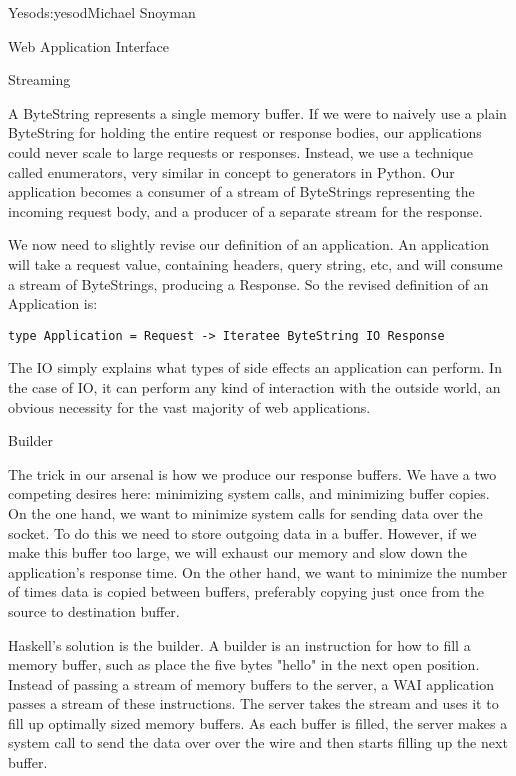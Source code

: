 \begin{aosachapter}{Yesod}{s:yesod}{Michael Snoyman}
\begin{aosasect1}{Web Application Interface}
\begin{aosasect2}{Streaming}

A ByteString represents a single memory buffer. If we were to naively
use a plain ByteString for holding the entire request or response
bodies, our applications could never scale to large requests or
responses. Instead, we use a technique called enumerators, very
similar in concept to generators in Python. Our application becomes a
consumer of a stream of ByteStrings representing the incoming request
body, and a producer of a separate stream for the response.

We now need to slightly revise our definition of an application. An
application will take a request value, containing headers, query
string, etc, and will consume a stream of ByteStrings, producing a
Response. So the revised definition of an Application is:

\begin{verbatim}
type Application = Request -> Iteratee ByteString IO Response
\end{verbatim}

The IO simply explains what types of side effects an application can
perform. In the case of IO, it can perform any kind of interaction
with the outside world, an obvious necessity for the vast majority of
web applications.

\end{aosasect2}

\begin{aosasect2}{Builder}

The trick in our arsenal is how we produce our response buffers. We
have a two competing desires here: minimizing system calls, and
minimizing buffer copies. On the one hand, we want to minimize system
calls for sending data over the socket. To do this we need to store
outgoing data in a buffer. However, if we make this buffer too large,
we will exhaust our memory and slow down the application's response
time. On the other hand, we want to minimize the number of times data
is copied between buffers, preferably copying just once from the
source to destination buffer.

Haskell's solution is the builder. A builder is an instruction for how
to fill a memory buffer, such as place the five bytes "hello" in the
next open position. Instead of passing a stream of memory buffers to
the server, a WAI application passes a stream of these
instructions. The server takes the stream and uses it to fill up
optimally sized memory buffers. As each buffer is filled, the server
makes a system call to send the data over over the wire and then
starts filling up the next buffer.


\end{aosasect2}
\end{aosasect1}
\end{aosachapter}
